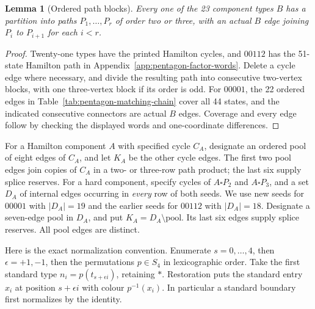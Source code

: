 \documentclass[11pt]{article}
\newtheorem{lemma}[theorem]{Lemma}
\theoremstyle{remark}
\numberwithin{equation}{section}
\numberwithin{table}{section}
\begin{document}
\begin{lemma}[Ordered path blocks]\label{lem:pentagon-path-blocks}
Every one of the 23 component types $B$ has a partition into paths
$P_1,\ldots,P_r$ of order two or three, with an actual $B$ edge
joining $P_i$ to $P_{i+1}$ for each $i<r$.
\end{lemma}
\begin{proof}
Twenty-one types have the printed Hamilton cycles, and $00112$ has
the 51-state Hamilton path in Appendix~\ref{app:pentagon-factor-words}.
Delete a cycle edge where necessary, and divide the resulting path
into consecutive two-vertex blocks, with one three-vertex block if
its order is odd. For $00001$, the 22 ordered edges in
Table~\ref{tab:pentagon-matching-chain} cover all 44 states, and the
indicated consecutive connectors are actual $B$ edges. Coverage and
every edge follow by checking the displayed words and one-coordinate
differences.
\end{proof}

For a Hamilton component $A$ with specified cycle $C_A$, designate an
ordered pool of eight edges of $C_A$, and let $K_A$ be the other cycle
edges. The first two pool edges join copies of $C_A$ in a two- or
three-row path product; the last six supply splice reserves.
For a hard component, specify cycles of $A\square P_2$ and
$A\square P_3$, and a set $D_A$ of internal edges occurring in
\emph{every} row of both seeds. We use new seeds for $00001$ with
$|D_A|=19$ and the earlier seeds for $00112$ with $|D_A|=18$.
Designate a seven-edge pool in $D_A$, and put $K_A=D_A\setminus
\text{pool}$. Its last six edges supply splice reserves. All pool
edges are distinct.

Here is the exact normalization convention. Enumerate $s=0,\ldots,4$,
then $\epsilon=+1,-1$, then the permutations $p\in S_4$ in lexicographic
order. Take the first standard type
$n_i=p(t_{s+\epsilon i})$, retaining $\ast$. Restoration puts the
standard entry $x_i$ at position $s+\epsilon i$ with colour $p^{-1}(x_i)$.
In particular a standard boundary first normalizes by the identity.
\end{document}
